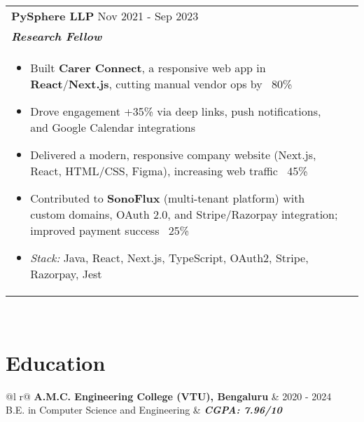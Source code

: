 \documentclass[a4paper,8pt]{article}
\begin{document}
\begin{tabularx}{\linewidth}{ @{}l r@{} }
\textbf{{PySphere LLP}} \hfill \color[HTML]{371e77} Nov 2021 - Sep 2023 \\[4pt]
\color[HTML]{371e77}\textbf{\textit{Research Fellow}} \hfill \color[HTML]{4B28A4} \\[5pt]
\begin{minipage}[t]{\linewidth}
    \begin{itemize}[nosep,after=\strut, leftmargin=2em, itemsep=2pt]
        \item Built \textbf{Carer Connect}, a responsive web app in \textbf{React}/\textbf{Next.js}, cutting manual vendor ops by ~80\%
        \item Drove engagement +35\% via deep links, push notifications, and Google Calendar integrations
        \item Delivered a modern, responsive company website (Next.js, React, HTML/CSS, Figma), increasing web traffic ~45\%
        \item Contributed to \textbf{SonoFlux} (multi-tenant platform) with custom domains, OAuth 2.0, and Stripe/Razorpay integration; improved payment success ~25\%
        \item \textit{Stack:} Java, React, Next.js, TypeScript, OAuth2, Stripe, Razorpay, Jest
    \end{itemize}
    \end{minipage}
\end{tabularx}\\[3pt]

\section{Education}
\begin{tabularx}{\linewidth}{ @{}l r@{} }
\textbf{A.M.C. Engineering College (VTU), Bengaluru} & \hfill \color[HTML]{371e77} 2020 - 2024 \\
\color[HTML]{371e77} B.E. in Computer Science and Engineering & \hfill \color[HTML]{4B28A4} \textit{\textbf{CGPA: 7.96/10}} \\
\end{tabularx}\\[3pt]

\end{document}

